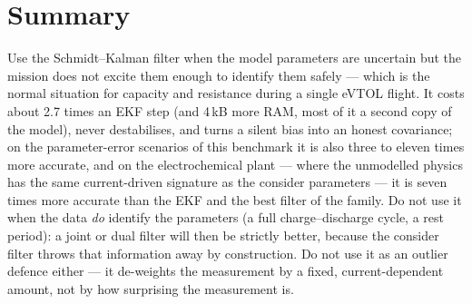 \section{Summary}
Use the Schmidt--Kalman filter when the model parameters are uncertain but the mission does not
excite them enough to identify them safely --- which is the normal situation for capacity and
resistance during a single eVTOL flight.  It costs about 2.7 times an EKF step (and 4\,kB more RAM, most of it a second copy of the
model), never destabilises, and turns a silent bias into an honest covariance; on the
parameter-error scenarios of this benchmark it is also three to eleven times more accurate, and on
the electrochemical plant --- where the unmodelled physics has the same current-driven signature as
the consider parameters --- it is seven times more accurate than the EKF and the best filter of the
family.  Do not use it when the data
\emph{do} identify the parameters (a full charge--discharge cycle, a rest period): a joint or dual
filter will then be strictly better, because the consider filter throws that information away by
construction.  Do not use it as an outlier defence either --- it de-weights the measurement by a
fixed, current-dependent amount, not by how surprising the measurement is.

